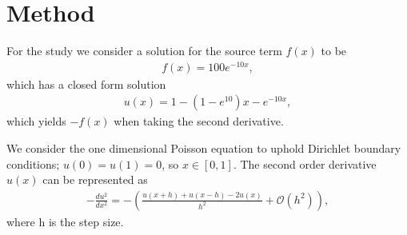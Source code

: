 \documentclass{emulateapj}
\begin{document}


\section{Method}
\label{sec:method}
For the study we consider a solution for the source term $f(x)$ to be
%
\begin{gather*}\label{eq:f(x)}
    f(x) = 100e^{-10x},
\end{gather*}
%
which has a closed form solution 
%
\begin{gather}\label{eq:u(x)}
u(x) = 1-(1-e^{10})x-e^{-10x},
\end{gather}
%
which yields $-f(x)$ when taking the second derivative. 

We consider the one dimensional Poisson equation to uphold Dirichlet boundary conditions; $u(0)=u(1)=0$, so $x \in [0,1]$. The second order derivative $u(x)$ can be represented as
%
\begin{gather}\label{eq:du/dx}
 -\frac{du^2}{dx^2} = -\left(\frac{u(x+h) + u(x-h) - 2u(x)}{h^2} + \mathcal{O}(h^2)\right),
\end{gather}
%
where h is the step size. 
\end{document}
